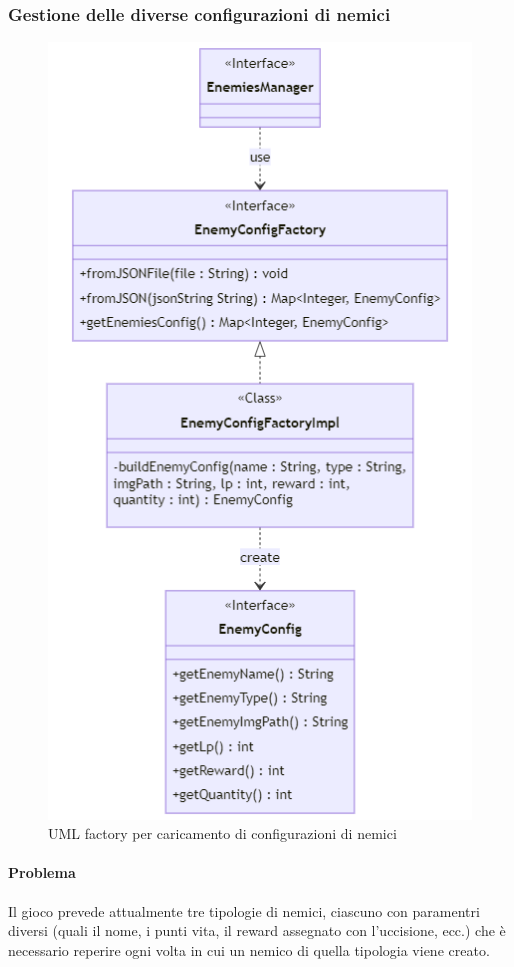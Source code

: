 \documentclass[a4paper,12pt]{report}
\begin{document}
\subsubsection{Gestione delle diverse configurazioni di nemici}

\begin{figure}[H]
    \centering
    \includegraphics[scale=0.8]{RelazioneTD/images/enemyConfigFactoryUML.png}
    \caption{UML factory per caricamento di configurazioni di nemici}
    \label{fig:enter-label}
\end{figure}

\paragraph{Problema} Il gioco prevede attualmente tre tipologie di nemici, ciascuno con paramentri diversi (quali il nome, i punti vita, il reward assegnato con l'uccisione, ecc.) che è necessario reperire ogni volta in cui un nemico di quella tipologia viene creato. 
\end{document}
